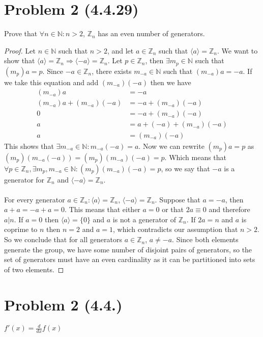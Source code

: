 \documentclass{article}
\begin{document}
\section*{Problem 2 (4.4.29)}
Prove that $\forall n \in \mathbb{N} : n > 2$, $\mathbb{Z}_n$ has an even number of generators.
\begin{proof}
    Let $n \in \mathbb{N}$ such that $n > 2$, and let $a \in \mathbb{Z}_n$ such that $\langle a \rangle = \mathbb{Z}_n$.
    We want to show that $\langle a \rangle = \mathbb{Z}_n \Rightarrow \langle -a \rangle = \mathbb{Z}_n$.
    Let $p \in \mathbb{Z}_n$, then $\exists m_p \in \mathbb{N}$ such that $(m_p)a = p$.
    Since $-a \in \mathbb{Z}_n$, there exists $m_{-a} \in \mathbb{N}$ such that $(m_{-a})a = -a$.
    If we take this equation and add $(m_{-a})(-a)$ then we have
    \begin{align*}
        (m_{-a})a & = -a \\
        (m_{-a})a + (m_{-a})(-a) & = -a + (m_{-a})(-a) \\
        0 & = -a + (m_{-a})(-a) \\
        a & = a + (-a) + (m_{-a})(-a) \\
        a & = (m_{-a})(-a)
    \end{align*}
    This shows that $\exists m_{-a} \in \mathbb{N} : m_{-a}(-a) = a$.
    Now we can rewrite $(m_p)a = p$ as $(m_p)(m_{-a}(-a)) = (m_p)(m_{-a})(-a) = p$.
    Which means that $\forall p \in \mathbb{Z}_n, \exists m_p,m_{-a} \in \mathbb{N} : (m_p)(m_{-a})(-a) = p$,
    so we say that $-a$ is a generator for $\mathbb{Z}_n$ and $\langle -a \rangle = \mathbb{Z}_n$.
    \\\\
    For every generator $a \in \mathbb{Z}_n : \langle a \rangle = \mathbb{Z}_n$, $\langle -a \rangle = \mathbb{Z}_n$.
    Suppose that $a = -a$, then $a + a = -a + a = 0$.
    This means that either $a = 0$ or that $2a \equiv 0$ and therefore $a | n$.
    If $a = 0$ then $\langle a \rangle = \{0\}$ and $a$ is not a generator of $\mathbb{Z}_n$.
    If $2a = n$ and $a$ is coprime to $n$ then $n = 2$ and $a = 1$, which contradicts our assumption that $n > 2$.
    So we conclude that for all generators $a \in \mathbb{Z}_n$, $a \neq -a$.
    Since both elements generate the group, we have some number of disjoint pairs of generators, so the set of generators must have an even cardinality as it can be partitioned into sets of two elements.
\end{proof}

\section*{Problem 2 (4.4.)}
$f'(x) = \frac{d}{dx}f(x)$
\end{document}
